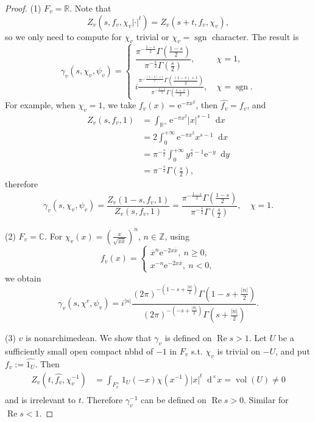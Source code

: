 \documentclass{article}
\theoremstyle{definition}
\theoremstyle{remark}
\renewcommand{\Re}{\mathop{\mathrm{Re}}}
\renewcommand{\bar}{\overline}
\renewcommand{\hat}{\widehat}
\newcommand{\R}{\mathbb{R}}
\newcommand{\C}{\mathbb{C}}
\newcommand{\Z}{\mathbb{Z}}
\DeclareMathOperator{\sgn}{sgn} %
\newcommand{\dx}{\mathop{}\!\mathrm{d}x}
\newcommand{\dxm}{\mathop{}\!\mathrm{d}^{\times}x}
\newcommand{\dy}{\mathop{}\!\mathrm{d}y}
\DeclareMathOperator{\vol}{vol}
\newcommand{\e}{\mathrm{e}}
\begin{document}
\begin{proof}
    (1) $F_v = \R$.
    Note that \[Z_v(s, f_v, \chi_v|\cdot|^t) = Z_v(s+t, f_v, \chi_v),\]
    so we only need to compute for $\chi_v$ trivial or $\chi_v = \sgn$ character.
    The result is \[\gamma_v(s, \chi_v, \psi_v) = \begin{cases}
        \dfrac{\pi^{-\frac{1-s}{2}}\Gamma\left( \frac{1-s}{2} \right)}{\pi^{-\frac{s}{2}}\Gamma\left( \frac{s}{2} \right)},\ &\chi = 1,\\
        i\frac{\pi^{-\frac{(1-s)+1}{2}}\Gamma\left( \frac{(1-s)+1}{2} \right)}{\pi^{-\frac{s+1}{2}}\Gamma\left( \frac{s+1}{2} \right)},\ &\chi = \sgn.
    \end{cases}\]
    For example, when $\chi_v = 1$, we take $f_v(x)=\e^{-\pi x^2}$, then $\hat{f_v}=f_v$, and\begin{align*}
        Z_v(s, f_v, 1) &= \int_{\R^\times}\e^{-\pi x^2}|x|^{s-1}\dx\\
        &= 2\int_{0}^{+\infty} \e^{-\pi x^2}x^{s-1}\dx \\
        &= \pi^{-\frac{s}{2}}\int_{0}^{+\infty}y^{\frac{s}{2}-1} \e^{-y}\dy\\
        &= \pi^{-\frac{s}{2}}\Gamma\left( \frac{s}{2} \right),
    \end{align*}
    therefore \begin{align*}
        \gamma_v(s, \chi_v, \psi_v)
        = \dfrac{Z_v(1-s, f_v, 1)}{Z_v(s, f_v, 1)}
        = \dfrac{\pi^{-\frac{1-s}{2}}\Gamma\left( \frac{1-s}{2} \right)}{\pi^{-\frac{s}{2}}\Gamma\left( \frac{s}{2} \right)},\ &\chi = 1.
    \end{align*}

    (2) $F_v = \C$. For $\chi_v(x) = \left( \frac{x}{\sqrt{x\bar{x}}} \right)^n$, $n\in\Z$,
    using \[f_v(x) = \begin{cases}
        \bar{x}^n\e^{-2x\bar{x}},\ n\ge 0,\\
        x^{-n}\e^{-2x\bar{x}},\ n < 0,
    \end{cases}\]
    we obtain \[\gamma_v(s, \chi^v, \psi_v) = i^{|n|}\frac{(2\pi)^{-\left(1-s+\frac{|n|}{2}\right)}\Gamma\left(1-s+\frac{|n|}{2}\right)}{(2\pi)^{-\left(-s+\frac{|n|}{2}\right)}\Gamma\left( s+\frac{|n|}{2} \right)}.\]


    (3) $v$ is nonarchimedean.
    We show that $\gamma_v$ is defined on $\Re s>1$. Let $U$ be a sufficiently small open compact nbhd of $-1$ in $F_v$ s.t. $\chi_v$ is trivial on $-U$, and put $f_v := \hat{1_U}$.
    Then \begin{align*}
        Z_v(t, \hat{f_v}, \chi_v^{-1}) &= \int_{F_v^\times} 1_U(-x)\chi(x^{-1})|x|^t\dxm =\vol(U)\neq 0 \\
    \end{align*}
    and is irrelevant to $t$. Therefore $\gamma_v^{-1}$ can be defined on $\Re s > 0$. Similar for $\Re s < 1$.
\end{proof}
\end{document}
